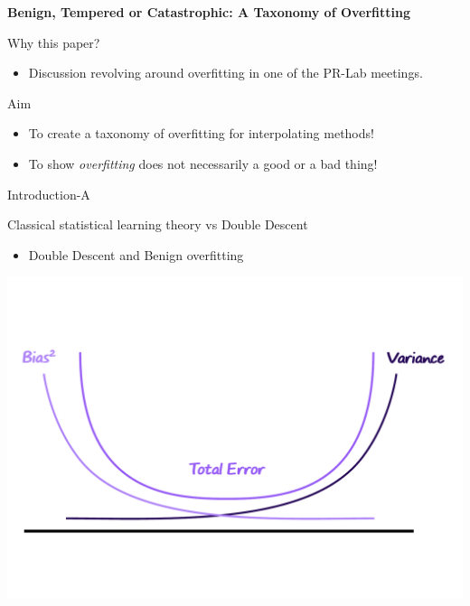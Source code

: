 \documentclass[aspectratio=169]{beamer}
\author{\authorlabel}
\newcommand{\mysubtitle}{\color{Pink}\Large{\textbf{Benign, Tempered or Catastrophic: A Taxonomy of Overfitting}}}
\begin{document}



\begin{frame}
  \centering
  \mysubtitle\cite{mallinar2022}
\end{frame}

\begin{frame}{Why this paper?}
  \centering
  \begin{itemize}
    \item Discussion revolving around overfitting in one of the PR-Lab meetings.
  \end{itemize}
\end{frame}

\begin{frame}{Aim}
  \centering
  \begin{itemize}
    \item To create a taxonomy of overfitting for interpolating methods!
    \item To show \textit{overfitting} does not necessarily a good or a bad thing!
  \end{itemize}
\end{frame}

\begin{frame}{Introduction-A}
  \begin{minipage}{0.5\textwidth}
    \color{Pink} Classical statistical learning theory vs Double Descent
    \begin{itemize}
      \item Double Descent and Benign overfitting
    \end{itemize}
  \end{minipage}%
  \begin{minipage}{0.5\textwidth}
    \includegraphics[width=\textwidth]{Figures/bias_variance}
  \end{minipage}
\end{frame}
\end{document}
